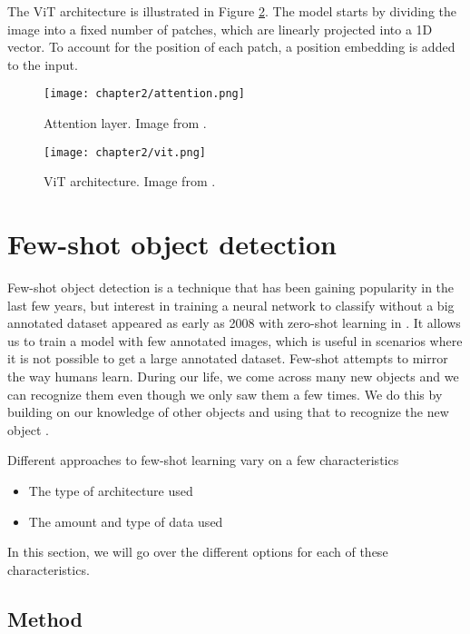 The ViT architecture is illustrated in Figure \ref{fig:2_vit}. The model starts by dividing the image into a fixed number of patches, which are linearly projected into a 1D vector. To account for the position of each patch, a position embedding is added to the input.

\begin{figure}[H]
	\centering
	\texttt{[image: chapter2/attention.png]}
	\caption{\label{fig:2_attention} Attention layer. Image from \citet{transformers}.}
\end{figure}

\begin{figure}[H]
	\centering
	\texttt{[image: chapter2/vit.png]}
	\caption{\label{fig:2_vit} ViT architecture. Image from \citet{vit}.}
\end{figure}




\section{Few-shot object detection}
Few-shot object detection is a technique that has been gaining popularity in the last few years, but interest in training a neural network to classify without a big annotated dataset appeared as early as 2008 with zero-shot learning in \citet{aaai08-132}. It allows us to train a model with few annotated images, which is useful in scenarios where it is not possible to get a large annotated dataset. Few-shot attempts to mirror the way humans learn. During our life, we come across many new objects and we can recognize them even though we only saw them a few times. We do this by building on our knowledge of other objects and using that to recognize the new object \cite{biederman1987recognition}. 

Different approaches to few-shot learning vary on a few characteristics
\begin{itemize}
	\item The type of architecture used
	\item The amount and type of data used
\end{itemize}

In this section, we will go over the different options for each of these characteristics.

\subsection{Method}

